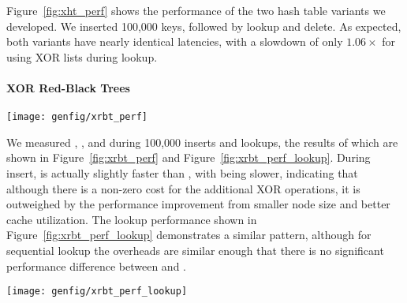 Figure~\ref{fig:xht_perf} shows the performance of the two hash table variants
we developed. We inserted 100,000 keys, followed by lookup and delete.
As expected, both variants have nearly identical latencies, with a slowdown of
only $1.06\times$ for using XOR lists during lookup.




\paragraph{XOR Red-Black Trees}








\begin{SCfigure}
	\centering
	\texttt{[image: genfig/xrbt\_perf]}
	\caption{Insert latency for XOR red-black trees compared to normal
		red-black trees. The label ``a'' shows the cost of the XORs, while ``b''
		shows the cost of the larger node.}
	\label{fig:xrbt_perf}
\end{SCfigure}



We measured \xrbt, \xrbtbig, and \rbt during 100,000 inserts and lookups, the results of
which are shown in Figure~\ref{fig:xrbt_perf} and
Figure~\ref{fig:xrbt_perf_lookup}. During insert, \xrbt is actually slightly
faster than \rbt, with \xrbtbig being slower, indicating that although there is
a non-zero cost for the additional XOR operations, it is outweighed by the
performance improvement from smaller node size and better cache utilization. The
lookup performance shown in Figure~\ref{fig:xrbt_perf_lookup} demonstrates a
similar pattern, although for sequential lookup the overheads are similar enough
that there is no significant performance difference between \xrbt and \rbt.

\begin{SCfigure}
	\centering
	\texttt{[image: genfig/xrbt\_perf\_lookup]}
	\caption{Lookup latency for XOR red-black trees compared to normal
		red-black trees.}
	\label{fig:xrbt_perf_lookup}
\end{SCfigure}

